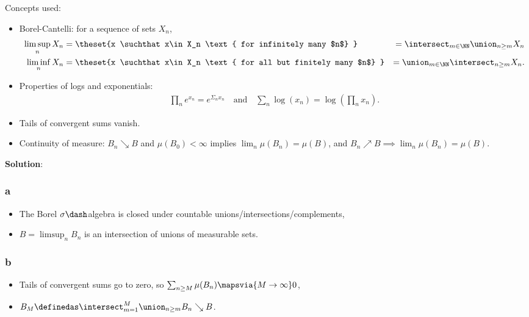 \begin{solution}

Concepts used:

\begin{itemize}
\item
  Borel-Cantelli: for a sequence of sets \(X_n\),
  \begin{align*}
  \limsup_n X_n &= \theset{x \suchthat x\in X_n \text{ for infinitely many $n$} } 
  &= \intersect_{m\in \NN} \union_{n\geq m} X_n
  \\
  \liminf_n X_n &= \theset{x \suchthat x\in X_n \text{ for all but finitely many $n$} }
  &= \union_{m\in \NN} \intersect_{n\geq m} X_n
  .\end{align*}
\item
  Properties of logs and exponentials:
  \begin{align*}
  \prod_n e^{x_n} = e^{\Sigma_n x_n} \quad\text{and} \quad \sum_n \log(x_n) = \log\left(\prod_n x_n\right)
  .\end{align*}
\item
  Tails of convergent sums vanish.
\item
  Continuity of measure: \(B_n \searrow B\) and \(\mu(B_0)<\infty\)
  implies \(\lim_n \mu(B_n) = \mu(B)\), and
  \(B_n\nearrow B \implies \lim_n \mu(B_n) = \mu(B)\).
\end{itemize}

\textbf{Solution}:

\hypertarget{a-5}{%
\subsubsection{a}\label{a-5}}

\begin{itemize}
\tightlist
\item
  The Borel \(\sigma\dash\)algebra is closed under countable
  unions/intersections/complements,
\item
  \(B = \limsup_n B_n\) is an intersection of unions of measurable sets.
\end{itemize}

\hypertarget{b-5}{%
\subsubsection{b}\label{b-5}}

\begin{itemize}
\tightlist
\item
  Tails of convergent sums go to zero, so
  \(\sum_{n\geq M} \mu(B_n) \mapsvia{M\to\infty} 0\),
\item
  \(B_M \definedas \intersect_{m = 1}^M \union_{n\geq m} B_n \searrow B\).
\end{itemize}


\end{solution}
